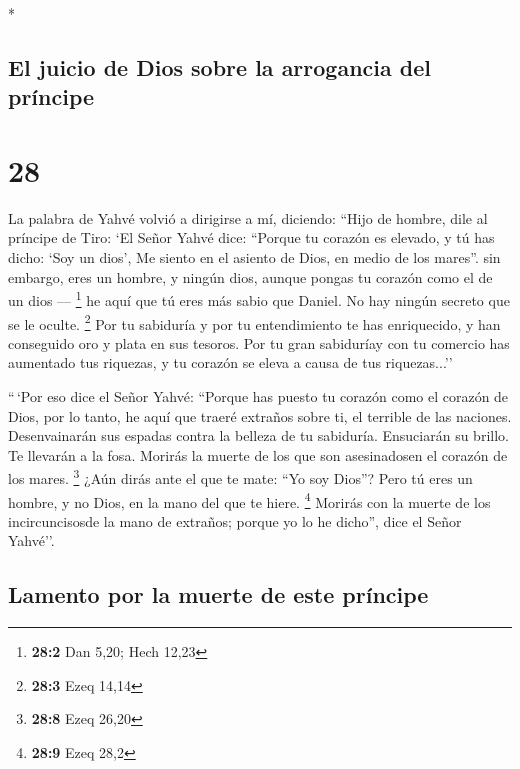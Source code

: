 \begin{paracol}{2}
\begin{otherlanguage}{english}
\end{otherlanguage}

\switchcolumn[0]*

\hypertarget{el-juicio-de-dios-sobre-la-arrogancia-del-pruxedncipe}{%
\subsection{El juicio de Dios sobre la arrogancia del
príncipe}\label{el-juicio-de-dios-sobre-la-arrogancia-del-pruxedncipe}}

\hypertarget{section-54}{%
\section{28}\label{section-54}}

 La palabra de Yahvé volvió a dirigirse a mí, diciendo:
 ``Hijo de hombre, dile al príncipe de Tiro: `El Señor
Yahvé dice: ``Porque tu corazón es elevado, y tú has dicho: `Soy un
dios', Me siento en el asiento de Dios, en medio de los mares''. sin
embargo, eres un hombre, y ningún dios, aunque pongas tu corazón como el
de un dios --- \footnote{\textbf{28:2} Dan 5,20; Hech 12,23}
 he aquí que tú eres más sabio que Daniel. No hay ningún
secreto que se le oculte. \footnote{\textbf{28:3} Ezeq 14,14}
 Por tu sabiduría y por tu entendimiento te has
enriquecido, y han conseguido oro y plata en sus tesoros. 
Por tu gran sabiduríay con tu comercio has aumentado tus riquezas, y tu
corazón se eleva a causa de tus riquezas...''

 ``\,`Por eso dice el Señor Yahvé: ``Porque has puesto tu
corazón como el corazón de Dios,  por lo tanto, he aquí
que traeré extraños sobre ti, el terrible de las naciones. Desenvainarán
sus espadas contra la belleza de tu sabiduría. Ensuciarán su brillo.
 Te llevarán a la fosa. Morirás la muerte de los que son
asesinadosen el corazón de los mares. \footnote{\textbf{28:8} Ezeq 26,20}
 ¿Aún dirás ante el que te mate: ``Yo soy Dios''? Pero tú
eres un hombre, y no Dios, en la mano del que te hiere. \footnote{\textbf{28:9}
  Ezeq 28,2}  Morirás con la muerte de los
incircuncisosde la mano de extraños; porque yo lo he dicho'', dice el
Señor Yahvé''.

\hypertarget{lamento-por-la-muerte-de-este-pruxedncipe}{%
\subsection{Lamento por la muerte de este
príncipe}\label{lamento-por-la-muerte-de-este-pruxedncipe}}


\end{paracol}
